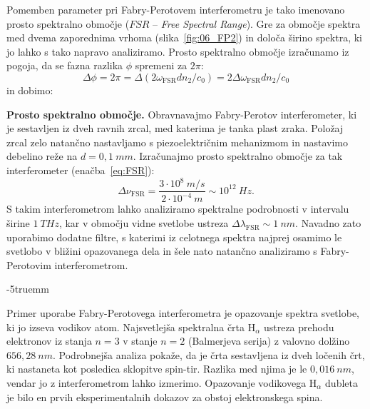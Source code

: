 Pomemben parameter pri Fabry-Perotovem interferometru je tako imenovano prosto
spektralno območje ($FSR$ -- {\it Free Spectral Range}). 
Gre za območje spektra med dvema zaporednima vrhoma (slika~\ref{fig:06_FP2})
in določa širino spektra, ki jo lahko s tako napravo analiziramo. 
Prosto spektralno območje izračunamo iz pogoja, da se fazna razlika $\phi$ spremeni
za $2\pi$:
\begin{equation}
\Delta \phi = 2 \pi = \Delta \left(2 \omega_\mathrm{FSR} d n_2/c_0\right)= 
2 \Delta \omega_\mathrm{FSR} dn_2/c_0
\label{eq:06_45}
\end{equation}
in dobimo:
\begin{example}{\bf Prosto spektralno območje.}
Obravnavajmo Fabry-Perotov interferometer, ki je sestavljen iz dveh ravnih zrcal, med 
katerima je tanka plast zraka. Položaj zrcal zelo natančno nastavljamo s piezoelektričnim 
mehanizmom in nastavimo debelino reže na $d=0,1~\si{mm}$. Izračunajmo
prosto spektralno območje za tak interferometer (enačba~\ref{eq:FSR}):
\begin{equation}
\Delta \nu_\textrm{FSR} = \frac{3 \cdot 10^8~\si{m/s}}{2 \cdot 10^{-4}~\si{m}} \sim 10^{12}~\si{Hz}.
\label{eq:06_51d}
\end{equation}
S takim interferometrom lahko analiziramo spektralne podrobnosti 
v intervalu širine $1~\si{THz}$, kar  v območju vidne svetlobe
ustreza $\Delta \lambda_\textrm{FSR} \sim 1~\si{nm}$. Navadno zato uporabimo dodatne filtre, 
s katerimi iz celotnega spektra najprej osamimo le svetlobo v bližini opazovanega dela in šele nato
natančno analiziramo s Fabry-Perotovim interferometrom. 
\end{example}
\vglue-5truemm
\begin{remark}
Primer uporabe Fabry-Perotovega interferometra 
je opazovanje spektra svetlobe, ki jo izseva vodikov atom. Najsvetlejša
spektralna črta H$_\alpha$ ustreza prehodu elektronov iz stanja 
$n=3$ v stanje $n=2$ (Balmerjeva serija) z valovno dolžino $656,28~\si{nm}$.
Podrobnejša analiza pokaže, da je črta sestavljena iz dveh ločenih črt, ki nastaneta
kot posledica sklopitve spin-tir. Razlika med njima je le $0,016~\si{nm}$, vendar jo
z interferometrom lahko izmerimo. Opazovanje vodikovega  H$_\alpha$ dubleta 
je bilo en prvih eksperimentalnih dokazov za obstoj elektronskega spina.
\end{remark}

